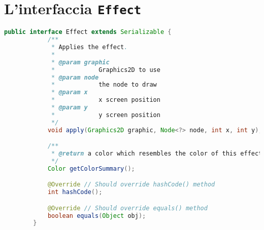 

\appendix
\chapter{L'interfaccia \texttt{Effect}}\label{appendix:effect}
    \begin{lstlisting}[language=Java]
        public interface Effect extends Serializable {
            /**
             * Applies the effect.
             *
             * @param graphic
             *            Graphics2D to use
             * @param node
             *            the node to draw
             * @param x
             *            x screen position
             * @param y
             *            y screen position
             */
            void apply(Graphics2D graphic, Node<?> node, int x, int y);

            /**
             * @return a color which resembles the color of this effect
             */
            Color getColorSummary();

            @Override // Should override hashCode() method
            int hashCode();

            @Override // Should override equals() method
            boolean equals(Object obj);
        }
    \end{lstlisting}

